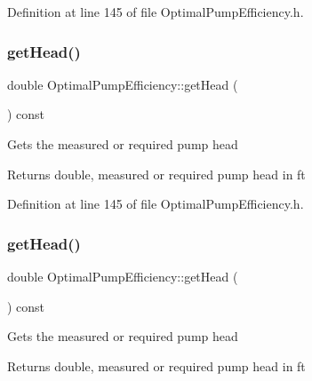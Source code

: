 Definition at line 145 of file Optimal\+Pump\+Efficiency.\+h.

\mbox{\label{class_optimal_pump_efficiency_af31fdb10aabc197ff7536c9bbe006573}} 
\subsubsection{\texorpdfstring{get\+Head()}{getHead()}\hspace{0.1cm}{\footnotesize\ttfamily [2/3]}}
{\footnotesize\ttfamily double Optimal\+Pump\+Efficiency\+::get\+Head (\begin{DoxyParamCaption}{ }\end{DoxyParamCaption}) const\hspace{0.3cm}{\ttfamily [inline]}}

Gets the measured or required pump head \begin{DoxyReturn}{Returns}
double, measured or required pump head in ft 
\end{DoxyReturn}


Definition at line 145 of file Optimal\+Pump\+Efficiency.\+h.

\mbox{\label{class_optimal_pump_efficiency_af31fdb10aabc197ff7536c9bbe006573}} 
\subsubsection{\texorpdfstring{get\+Head()}{getHead()}\hspace{0.1cm}{\footnotesize\ttfamily [3/3]}}
{\footnotesize\ttfamily double Optimal\+Pump\+Efficiency\+::get\+Head (\begin{DoxyParamCaption}{ }\end{DoxyParamCaption}) const\hspace{0.3cm}{\ttfamily [inline]}}

Gets the measured or required pump head \begin{DoxyReturn}{Returns}
double, measured or required pump head in ft 
\end{DoxyReturn}



